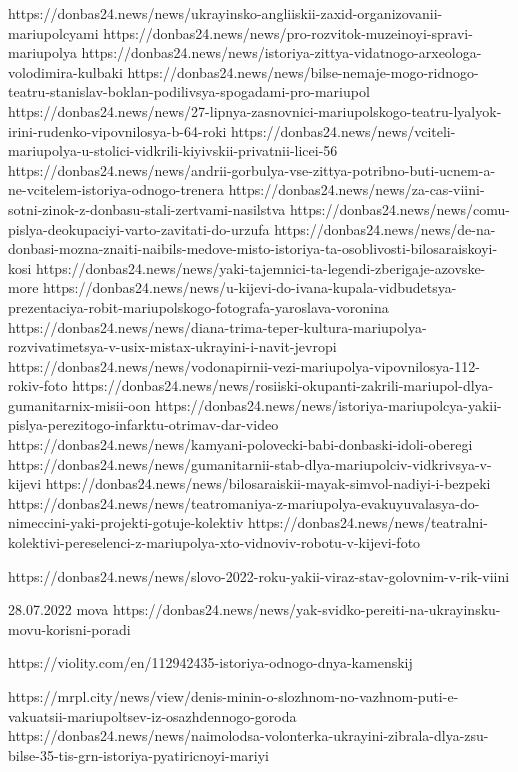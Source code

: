 https://donbas24.news/news/ukrayinsko-angliiskii-zaxid-organizovanii-mariupolcyami
https://donbas24.news/news/pro-rozvitok-muzeinoyi-spravi-mariupolya
https://donbas24.news/news/istoriya-zittya-vidatnogo-arxeologa-volodimira-kulbaki
https://donbas24.news/news/bilse-nemaje-mogo-ridnogo-teatru-stanislav-boklan-podilivsya-spogadami-pro-mariupol
https://donbas24.news/news/27-lipnya-zasnovnici-mariupolskogo-teatru-lyalyok-irini-rudenko-vipovnilosya-b-64-roki
https://donbas24.news/news/vciteli-mariupolya-u-stolici-vidkrili-kiyivskii-privatnii-licei-56
https://donbas24.news/news/andrii-gorbulya-vse-zittya-potribno-buti-ucnem-a-ne-vcitelem-istoriya-odnogo-trenera
https://donbas24.news/news/za-cas-viini-sotni-zinok-z-donbasu-stali-zertvami-nasilstva
https://donbas24.news/news/comu-pislya-deokupaciyi-varto-zavitati-do-urzufa
https://donbas24.news/news/de-na-donbasi-mozna-znaiti-naibils-medove-misto-istoriya-ta-osoblivosti-bilosaraiskoyi-kosi
https://donbas24.news/news/yaki-tajemnici-ta-legendi-zberigaje-azovske-more
https://donbas24.news/news/u-kijevi-do-ivana-kupala-vidbudetsya-prezentaciya-robit-mariupolskogo-fotografa-yaroslava-voronina
https://donbas24.news/news/diana-trima-teper-kultura-mariupolya-rozvivatimetsya-v-usix-mistax-ukrayini-i-navit-jevropi
https://donbas24.news/news/vodonapirnii-vezi-mariupolya-vipovnilosya-112-rokiv-foto
https://donbas24.news/news/rosiiski-okupanti-zakrili-mariupol-dlya-gumanitarnix-misii-oon
https://donbas24.news/news/istoriya-mariupolcya-yakii-pislya-perezitogo-infarktu-otrimav-dar-video
https://donbas24.news/news/kamyani-polovecki-babi-donbaski-idoli-oberegi
https://donbas24.news/news/gumanitarnii-stab-dlya-mariupolciv-vidkrivsya-v-kijevi
https://donbas24.news/news/bilosaraiskii-mayak-simvol-nadiyi-i-bezpeki
https://donbas24.news/news/teatromaniya-z-mariupolya-evakuyuvalasya-do-nimeccini-yaki-projekti-gotuje-kolektiv
https://donbas24.news/news/teatralni-kolektivi-pereselenci-z-mariupolya-xto-vidnoviv-robotu-v-kijevi-foto

https://donbas24.news/news/slovo-2022-roku-yakii-viraz-stav-golovnim-v-rik-viini

28.07.2022 mova
https://donbas24.news/news/yak-svidko-pereiti-na-ukrayinsku-movu-korisni-poradi

https://violity.com/en/112942435-istoriya-odnogo-dnya-kamenskij

https://mrpl.city/news/view/denis-minin-o-slozhnom-no-vazhnom-puti-e-vakuatsii-mariupoltsev-iz-osazhdennogo-goroda
https://donbas24.news/news/naimolodsa-volonterka-ukrayini-zibrala-dlya-zsu-bilse-35-tis-grn-istoriya-pyatiricnoyi-mariyi

